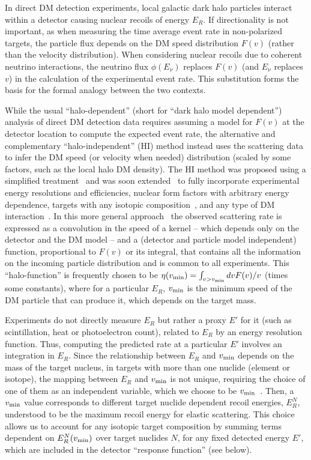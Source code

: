 \documentclass[a4paper,11pt]{article}
\renewcommand\({\left(}
\renewcommand\){\right)}
\renewcommand\[{\left[}
\renewcommand\]{\right]}
\theoremstyle{definition}
\begin{document}
In direct DM  detection experiments, local galactic dark halo particles interact within a detector causing nuclear recoils of energy $E_R$. If directionality is not important, as when measuring the time average event rate in non-polarized targets, the particle flux depends on the DM speed distribution $F(v)$ (rather than the velocity distribution).  When considering nuclear recoils due to coherent neutrino interactions,  the neutrino flux $\phi(E_\nu)$ replaces $F(v)$ (and $E_\nu$ replaces $v$) in the calculation of the experimental event rate. This substitution forms the basis for the formal analogy between the two contexts.

While the usual ``halo-dependent'' (short for ``dark halo model dependent'') analysis of direct DM detection data requires assuming a model for $F(v)$ at the detector location to compute the expected event rate, the alternative and complementary ``halo-independent'' (HI) method instead uses the scattering data to infer the  DM speed (or velocity when needed) distribution (scaled by some factors, such as the local halo DM density).  The HI method was proposed using a simplified treatment~\cite{Fox:2010bz} and was soon extended~\cite{Gondolo:2012rs}
to fully incorporate experimental energy resolutions and efficiencies, nuclear form factors with arbitrary energy dependence, targets with any isotopic composition~\cite{DelNobile:2013cta}, and any type of DM interaction~\cite{DelNobile:2013cva}. 
In this more general approach~\cite{Gondolo:2012rs,DelNobile:2013cta,DelNobile:2013cva} the observed scattering  rate
is expressed as a convolution in the speed of a kernel -- which depends  only on the detector and the DM model -- and a (detector and particle model independent) function, proportional to $F(v)$ or its integral,  that contains all the information on the incoming particle distribution and is common to all experiments.  This ``halo-function''  is frequently chosen to be
$\eta(v_{\rm min})= \int_{v>v_{\rm min}}  dv {F(v)}/{v}$
(times some constants), where for a particular $E_R$,  $v_{\rm min}$ is the minimum speed of the DM particle that can produce it, which depends on the target mass.

Experiments do not directly measure $E_R$  but rather a proxy $E'$ for it (such as scintillation, heat or photoelectron count), related to $E_R$ by an energy resolution function. Thus, computing the predicted rate at a particular $E'$ involves  an integration in $E_R$. 
Since the relationship between $E_R$ and  $v_{\rm min}$ depends on the mass of the target nucleus, in targets with more than one nuclide (element or isotope), the mapping between $E_R$ and $v_{\rm min}$ is not unique, requiring the choice of one of them as an independent variable, which we choose to be $v_{\rm min}$~\cite{Gondolo:2012rs}. Then, a $v_{\rm min}$ value corresponds to different target nuclide dependent recoil energies, $E_R^N$, understood to be the maximum recoil energy for elastic scattering. This choice allows us to account for any isotopic target composition by summing terms dependent on $E_R^N (v_{\rm min})$ over target nuclides $N$, for any fixed detected energy $E'$, which are included in the detector ``response function'' (see below).
\end{document}
